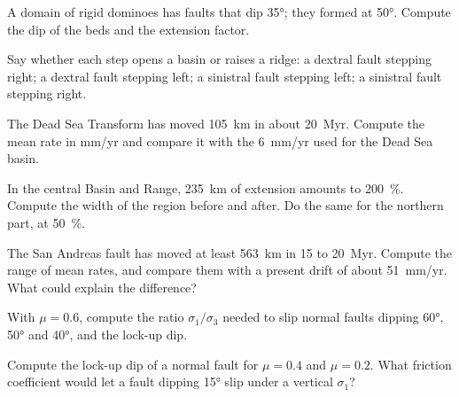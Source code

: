 \begin{exercise}[$\star$]\label{exo:b3:extension-strike-slip:1}
A domain of rigid dominoes has faults that dip \ang{35}; they formed at
\ang{50}. Compute the dip of the beds and the extension factor.
\end{exercise}

\begin{exercise}[$\star$]\label{exo:b3:extension-strike-slip:2}
Say whether each step opens a basin or raises a ridge: a dextral fault
stepping right; a dextral fault stepping left; a sinistral fault stepping
left; a sinistral fault stepping right.
\end{exercise}

\begin{exercise}[$\star$]\label{exo:b3:extension-strike-slip:3}
The Dead Sea Transform has moved \qty{105}{km} in about \qty{20}{Myr}.
Compute the mean rate in \unit{mm/yr} and compare it with the \qty{6}{mm/yr}
used for the Dead Sea basin.
\end{exercise}

\begin{exercise}[$\star$]\label{exo:b3:extension-strike-slip:4}
In the central Basin and Range, \qty{235}{km} of extension amounts to
\qty{200}{\percent}. Compute the width of the region before and after. Do the
same for the northern part, at \qty{50}{\percent}.
\end{exercise}

\begin{exercise}[$\star\star$]\label{exo:b3:extension-strike-slip:5}
The San Andreas fault has moved at least \qty{563}{km} in 15 to
\qty{20}{Myr}. Compute the range of mean rates, and compare them with a
present drift of about \qty{51}{mm/yr}. What could explain the difference?
\end{exercise}

\begin{exercise}[$\star\star$]\label{exo:b3:extension-strike-slip:6}
With $\mu = 0.6$, compute the ratio $\sigma_1/\sigma_3$ needed to slip normal
faults dipping \ang{60}, \ang{50} and \ang{40}, and the lock-up dip.
\end{exercise}

\begin{exercise}[$\star\star$]\label{exo:b3:extension-strike-slip:7}
Compute the lock-up dip of a normal fault for $\mu = 0.4$ and $\mu = 0.2$.
What friction coefficient would let a fault dipping \ang{15} slip under a
vertical $\sigma_1$?
\end{exercise}

